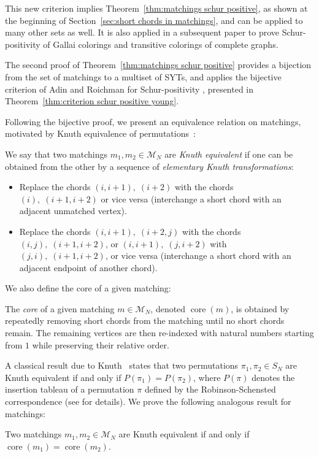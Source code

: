 \documentclass[ALCO]{cedram}
\newcommand{\core}{\operatorname{core}}
\newcommand{\M}{\mathcal{M}}
\begin{document}
This new criterion implies Theorem~\ref{thm:matchings schur positive}, %
as shown at the beginning of Section~\ref{sec:short chords in matchings}, and can be applied to many other sets as well.
It is also applied in a subsequent paper \cite{gallai} to prove Schur-positivity of Gallai colorings and transitive colorings of complete graphs.

The second proof of Theorem~\ref{thm:matchings schur positive} provides a bijection from the set of matchings to a multiset of SYTs,
and applies the bijective criterion of Adin and Roichman for Schur-positivity \cite[Prop.\ 9.1]{adin_roichman_fine_set}, presented in Theorem~\ref{thm:criterion schur positive young}.

Following the bijective proof, we present an equivalence relation on matchings, motivated by Knuth equivalence of permutations~\cite{knuth1970permutations}:
\begin{definition}\label{def:knuth like equivalence}
    We say that two matchings $m_1,m_2 \in \M_N$ are \emph{Knuth equivalent} if one can be obtained from the other by a sequence of \emph{elementary Knuth transformations}:
    \begin{itemize}
        \item Replace the chords $(i,i+1),\; (i+2)$ with the chords $(i),\; (i+1,i+2)$ or vice versa (\ie interchange a short chord with an adjacent unmatched vertex).
        \item Replace the chords $(i,i+1),\; (i+2,j)$ with the chords $(i,j),\; (i+1,i+2)$, or $(i,i+1),\; (j,i+2)$ with $(j,i),\; (i+1,i+2)$, or vice versa (\ie interchange a short chord with an adjacent endpoint of another chord).
    \end{itemize}
\end{definition}

We also define the core of a given matching:

\begin{definition}
    The \emph{core} of a given matching $m \in \M_N$, denoted $\core(m)$, is obtained by repeatedly removing short chords from the matching until no short chords remain. The remaining vertices are then re-indexed with natural numbers starting from $1$ while preserving their relative order.

\end{definition}

A classical result due to Knuth~\cite{knuth1970permutations} states that two permutations $\pi_1,\pi_2 \in S_N$ are Knuth equivalent if and only if $P(\pi_1) = P(\pi_2)$, where $P(\pi)$ denotes the insertion tableau of a permutation $\pi$ defined by the Robinson-Schensted correspondence (see \cite[Section 3]{sagan_book} for details). We prove the following analogous result for matchings:
\begin{theorem}
    Two matchings $m_1, m_2 \in \M_N$ are Knuth equivalent if and only if $\core(m_1) = \core(m_2)$.
\end{theorem}
\end{document}
